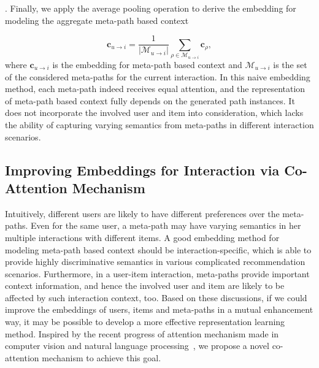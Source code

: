 . Finally, we apply the average pooling operation to derive the embedding for modeling the aggregate meta-path based context

\begin{equation} \label{equ-avg}
\mathbf{c}_{u \rightarrow i} = \frac{1}{|\mathcal{M}_{u \rightarrow i}|}\sum_{\rho \in \mathcal{M}_{u \rightarrow i} }\mathbf{c}_{\rho},
\end{equation}
where $\mathbf{c}_{u \rightarrow i}$ is the embedding for meta-path based context and $\mathcal{M}_{u \rightarrow i}$ is the set of the considered meta-paths for the current interaction. In this naive embedding method, each meta-path indeed receives equal attention, and
the representation of meta-path based context fully depends on the generated path instances.
It does not incorporate the involved user and item into consideration, which lacks the ability of capturing varying semantics from meta-paths in different interaction scenarios.

\subsection{Improving Embeddings for Interaction via Co-Attention Mechanism}
Intuitively, different users are likely to have different preferences over the meta-paths.
Even for the same user, a meta-path may have varying semantics in her multiple interactions with different items.
A good embedding method for modeling meta-path based context should be interaction-specific,
which is able to provide highly discriminative semantics in various complicated recommendation scenarios.
Furthermore, in a user-item interaction, meta-paths provide important context information, and hence the involved user and item are likely to be affected
by such interaction context, too.
Based on these discussions, if we could improve the embeddings of users, items and meta-paths in a mutual enhancement way,
it may be possible to  develop a more effective representation learning method.
Inspired by the recent progress of attention mechanism made in computer vision and natural language processing~\cite{xu2015show,phan2017neupl},
we propose a novel co-attention mechanism to achieve this goal.


